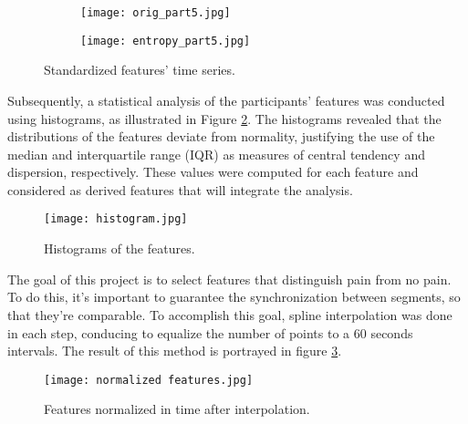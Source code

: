 \begin{figure}[htbp]
    \centering
    \begin{subfigure}{\linewidth}
        \centering
        \texttt{[image: orig\_part5.jpg]}
    \end{subfigure}
    
    \vspace{0.3em} %
    
    \begin{subfigure}{\linewidth}
        \centering
        \texttt{[image: entropy\_part5.jpg]}
    \end{subfigure}
    
    \caption{Standardized features' time series.}
    \label{fig:featurestimeseries}
\end{figure}


Subsequently, a statistical analysis of the participants’ features was conducted using histograms, as illustrated in Figure \ref{fig:histogram}. The histograms revealed that the distributions of the features deviate from normality, justifying the use of the median and interquartile range (IQR) as measures of central tendency and dispersion, respectively.
These values were computed for each feature and considered as derived features that will integrate the analysis.

\begin{figure}[h!]
    \centering
    \texttt{[image: histogram.jpg]}
    \caption{Histograms of the features.}
    \label{fig:histogram}
\end{figure}

The goal of this project is to select features that distinguish pain from no pain. To do this, it’s important to guarantee the synchronization between segments, so that they’re comparable. To accomplish this goal, spline interpolation was done in each step, conducing to equalize the number of points to a 60 seconds intervals. The result of this method is portrayed in figure \ref{fig:normalizedfeatures}. 

\begin{figure}[h!]
    \centering
    \texttt{[image: normalized features.jpg]}
    \caption{Features normalized in time after interpolation.}
    \label{fig:normalizedfeatures}
\end{figure}











